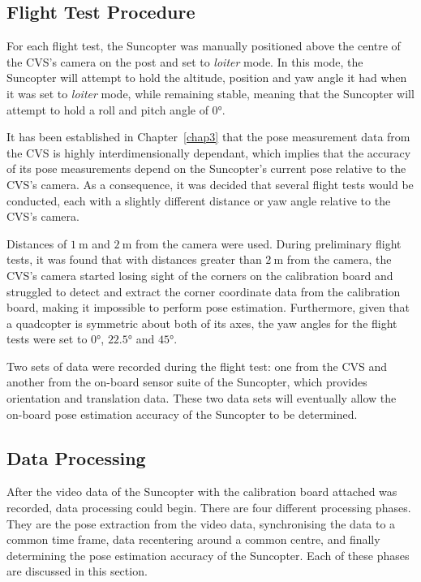 \subsection{Flight Test Procedure}

For each flight test, the Suncopter was manually positioned above the centre of the CVS's camera on the post and set to \emph{loiter} mode. In this mode, the Suncopter will attempt to hold the altitude, position and yaw angle it had when it was set to \emph{loiter} mode, while remaining stable, meaning that the Suncopter will attempt to hold a roll and pitch angle of $\ang{0}$. 

It has been established in Chapter~\ref{chap3} that the pose measurement data from the CVS is highly interdimensionally dependant, which implies that the accuracy of its pose measurements depend on the Suncopter's current pose relative to the CVS's camera. As a consequence, it was decided that several flight tests would be conducted, each with a slightly different distance or yaw angle relative to the CVS's camera. 

Distances of $\SI{1}{\m}$ and $\SI{2}{\m}$ from the camera were used. During preliminary flight tests, it was found that with distances greater than $\SI{2}{\m}$ from the camera, the CVS's camera started losing sight of the corners on the calibration board and struggled to detect and extract the corner coordinate data from the calibration board, making it impossible to perform pose estimation. Furthermore, given that a quadcopter is symmetric about both of its axes, the yaw angles for the flight tests were set to $\ang{0}$, $\ang{22.5}$ and $\ang{45}$. 

Two sets of data were recorded during the flight test: one from the CVS and another from the on-board sensor suite of the Suncopter, which provides orientation and translation data. These two data sets will eventually allow the on-board pose estimation accuracy of the Suncopter to be determined. 

\subsection{Data Processing}

After the video data of the Suncopter with the calibration board attached was recorded, data processing could begin. There are four different processing phases. They are the pose extraction from the video data, synchronising the data to a common time frame, data recentering around a common centre, and finally determining the pose estimation accuracy of the Suncopter. Each of these phases are discussed in this section. 

